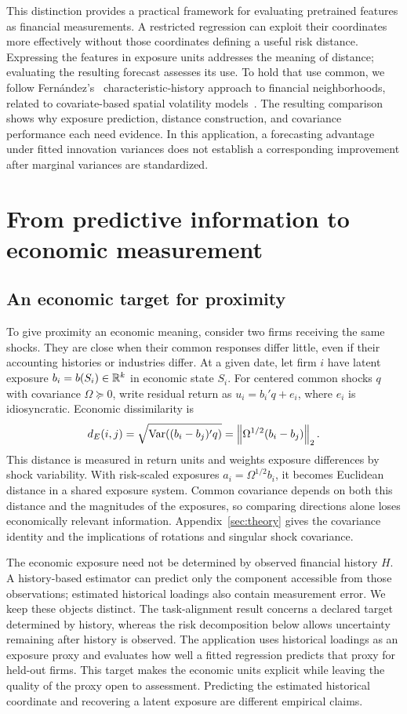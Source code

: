 \documentclass[11pt]{article}
\begin{document}
This distinction provides a practical framework for evaluating pretrained
features as financial measurements. A restricted regression can exploit their
coordinates more effectively without those coordinates defining a useful risk
distance. Expressing the features in exposure units addresses the meaning of
distance; evaluating the resulting forecast assesses its use. To hold that use
common, we follow Fern\'andez's~\cite{fernandez} characteristic-history approach
to financial neighborhoods, related to covariate-based spatial volatility
models~\cite{fulleotto}. The resulting comparison shows why exposure prediction,
distance construction, and covariance performance each need evidence. In this
application, a forecasting advantage under fitted innovation variances does not
establish a corresponding improvement after marginal variances are standardized.

\section{From predictive information to economic
measurement}\label{sec:measurement}
\subsection{An economic target for proximity}
To give proximity an economic meaning, consider two firms receiving the same
shocks. They are close when their common responses differ little, even if their
accounting histories or industries differ. At a given date, let firm $i$ have
latent exposure $b_i=b(S_i)\in\mathbb{R}^k$ in economic state $S_i$. For centered common
shocks $q$ with covariance $\Omega\succeq0$, write residual return as
$u_i=b_i'q+e_i$, where $e_i$ is idiosyncratic. Economic dissimilarity is
\begin{equation}\label{eq:economic-distance}
  d_E(i,j)=\sqrt{\operatorname{Var}((b_i-b_j)'q)}
  =\left\lVert\Omega^{1/2}(b_i-b_j)\right\rVert_2.
\end{equation}
This distance is measured in return units and weights exposure differences by
shock variability. With risk-scaled exposures $a_i=\Omega^{1/2}b_i$, it becomes
Euclidean distance in a shared exposure system. Common covariance depends on
both this distance and the magnitudes of the exposures, so comparing directions
alone loses economically relevant information. Appendix~\ref{sec:theory} gives
the covariance identity and the implications of rotations and singular shock
covariance.

The economic exposure need not be determined by observed financial history
$H$. A history-based estimator can predict only the component accessible from
those observations; estimated historical loadings also contain measurement
error. We keep these objects distinct. The task-alignment result concerns a
declared target determined by history, whereas the risk decomposition below
allows uncertainty remaining after history is observed. The application uses
historical loadings as an exposure proxy and evaluates how well a fitted
regression predicts that proxy for held-out firms. This target makes the
economic units explicit while leaving the quality of the proxy open to
assessment. Predicting the estimated historical coordinate and recovering a
latent exposure are different empirical claims.
\end{document}
